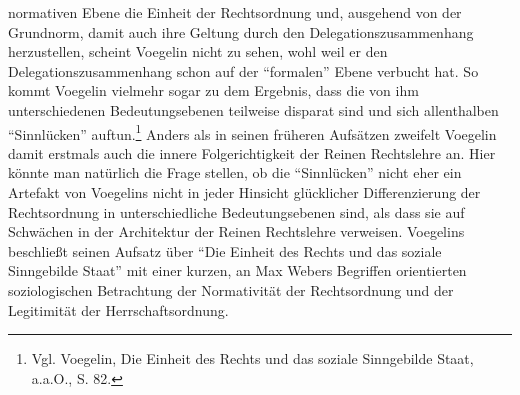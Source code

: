 \documentclass[12pt,a4paper,ngerman]{article}
\begin{document}
normativen Ebene die Einheit der Rechtsordnung und, ausgehend von der
Grundnorm, damit auch ihre Geltung durch den Delegationszusammenhang
herzustellen, scheint Voegelin nicht zu sehen, wohl weil er den
Delegationszusammenhang schon auf der "`formalen"' Ebene verbucht hat. So
kommt Voegelin vielmehr sogar zu dem Ergebnis, dass die von ihm
unterschiedenen Bedeutungsebenen teilweise disparat sind und sich allenthalben
"`Sinnlücken"' auftun.\footnote{Vgl. Voegelin, Die Einheit des Rechts und das
  soziale Sinngebilde Staat, a.a.O., S. 82.} Anders als in seinen früheren
Aufsätzen zweifelt Voegelin damit erstmals auch die innere Folgerichtigkeit
der Reinen Rechtslehre an. Hier könnte man natürlich die Frage stellen, ob die
"`Sinnlücken"' nicht eher ein Artefakt von Voegelins nicht in jeder Hinsicht
glücklicher Differenzierung der Rechtsordnung in unterschiedliche
Bedeutungsebenen sind, als dass sie auf Schwächen in der Architektur der
Reinen Rechtslehre verweisen.
Voegelins beschließt seinen Aufsatz über "`Die Einheit des Rechts und das
soziale Sinngebilde Staat"' mit einer kurzen, an Max Webers Begriffen
orientierten soziologischen Betrachtung der Normativität der Rechtsordnung und
der Legitimität der Herrschaftsordnung.
\end{document}
